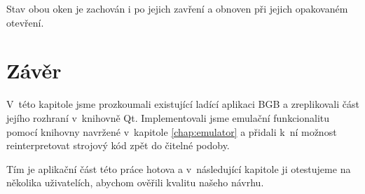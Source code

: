 
Stav obou oken je zachován i po jejich zavření a obnoven při jejich opakovaném otevření.

\section{Závěr}

V~této kapitole jsme prozkoumali existující ladící aplikaci BGB a zreplikovali část jejího rozhraní v~knihovně Qt. Implementovali jsme emulační funkcionalitu pomocí knihovny navržené v~kapitole \ref{chap:emulator} a přidali k~ní možnost reinterpretovat strojový kód zpět do čitelné podoby.

Tím je aplikační část této práce hotova a v~následující kapitole ji otestujeme na několika uživatelích, abychom ověřili kvalitu našeho návrhu.